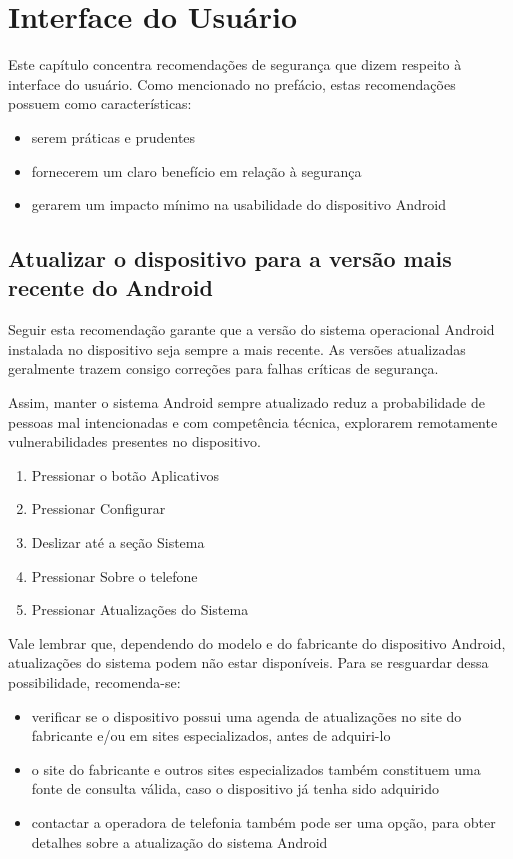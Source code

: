 \chapter{Interface do Usu\'ario}

Este cap\'itulo concentra recomenda\c c\~oes de seguran\c ca que dizem respeito \`a interface do usu\'ario. Como mencionado no pref\'acio, estas recomenda\c c\~oes possuem como caracter\'isticas:

\begin{itemize}
\item serem pr\'aticas e prudentes
\item fornecerem um claro benef\'icio em rela\c c\~ao \`a seguran\c ca
\item gerarem um impacto m\'inimo na usabilidade do dispositivo Android
\end{itemize}

\section{Atualizar o dispositivo para a vers\~ao mais recente do Android}

Seguir esta recomenda\c c\~ao garante que a vers\~ao do sistema operacional Android instalada no dispositivo seja sempre a mais recente. As vers\~oes atualizadas geralmente trazem consigo corre\c c\~oes para falhas cr\'iticas de seguran\c ca. 

Assim, manter o sistema Android sempre atualizado reduz a probabilidade de pessoas mal intencionadas e com compet\^encia t\'ecnica, explorarem remotamente vulnerabilidades presentes no dispositivo. 

\begin{enumerate}
\item Pressionar o bot\~ao Aplicativos
\item Pressionar Configurar
\item Deslizar at\'e a se\c c\~ao Sistema
\item Pressionar Sobre o telefone
\item Pressionar Atualiza\c c\~oes do Sistema
\end{enumerate}

Vale lembrar que, dependendo do modelo e do fabricante do dispositivo Android, atualiza\c c\~oes do sistema podem n\~ao estar dispon\'iveis. Para se resguardar dessa possibilidade, recomenda-se:

\begin{itemize} 
\item verificar se o dispositivo possui uma agenda de atualiza\c c\~oes no site do fabricante e/ou em sites especializados, antes de adquiri-lo
\item o site do fabricante e outros sites especializados tamb\'em constituem uma fonte de consulta v\'alida, caso o dispositivo j\'a tenha sido adquirido
\item contactar a operadora de telefonia tamb\'em pode ser uma op\c c\~ao, para obter detalhes sobre a atualiza\c c\~ao do sistema Android
\end{itemize} 

